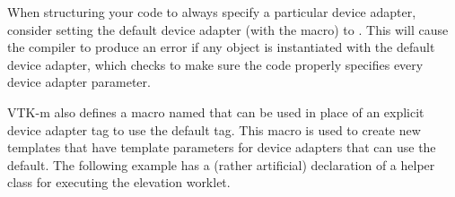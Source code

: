 

When structuring your code to always specify a particular device adapter,
consider setting the default device adapter (with the
 macro) to
. This will cause the compiler to
produce an error if any object is instantiated with the default device
adapter, which checks to make sure the code properly specifies every device
adapter parameter.

VTK-m also defines a macro named
 that can be used in place
of an explicit device adapter tag to use the default tag. This macro is
used to create new templates that have template parameters for device
adapters that can use the default. The following example has a (rather
artificial) declaration of a helper class for executing the elevation
worklet.



